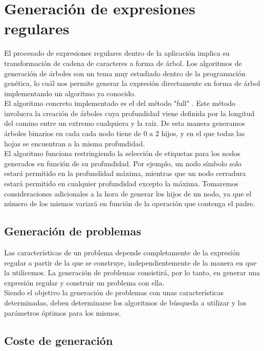 
\section{Generación de expresiones regulares}

El procesado de expresiones regulares dentro de la aplicación implica su transformación de cadena de caracteres a forma de árbol.
Los algoritmos de generación de árboles son un tema muy estudiado dentro de la programación genética, lo cuál nos permite generar la expresión directamente en forma de árbol implementando un algoritmo ya conocido.
\\
El algoritmo concreto implementado es el del método "full" \cite{koza92}.
Este método involucra la creación de árboles cuya profundidad viene definida por la longitud del camino entre un extremo cualquiera y la raíz.
De esta manera generamos árboles binarios en cada cada nodo tiene de 0 a 2 hijos, y en el que todas las hojas se encuentran a la misma profundidad.
\\
El algoritmo funciona restringiendo la selección de etiquetas para los nodos generados en función de su profundidad.
Por ejemplo, un nodo símbolo solo estará permitido en la profundidad máxima, mientras que un nodo cerradura estará permitido en cualquier profundidad excepto la máxima.
Tomaremos consideraciones adicionales a la hora de generar los hijos de un nodo, ya que el número de los mismos variará en función de la operación que contenga el padre.

\subsection{Generación de problemas}

Las características de un problema depende completamente de la expresión regular a partir de la que se construye, independientemente de la manera en que la utilicemos.
La generación de problemas consistirá, por lo tanto, en generar una expresión regular y construir un problema con ella.
\\
Siendo el objetivo la generación de problemas con unas características determinadas, deben determinarse los algoritmos de búsqueda a utilizar y los parámetros óptimos para los mismos.


\subsection{Coste de generación}

